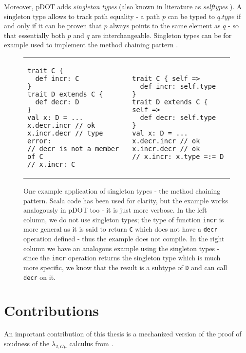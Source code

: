 Moreover, pDOT adds \textit{singleton types} (also known in literature as \textit{selftypes} \cite{zenger}). A singleton type allows to track path equality - a path $p$ can be typed to $q.type$ if and only if it can be proven that $p$ always points to the same element as $q$ - so that essentially both $p$ and $q$ are interchangeable. Singleton types can be for example used to implement the method chaining pattern \cite{pDOT}.

\begin{figure}[h]
\caption{One example application of singleton types - the method chaining pattern. Scala code has been used for clarity, but the example works analogously in pDOT too - it is just more verbose. In the left column, we do not use singleton types; the type of function \texttt{incr} is more general as it is said to return \texttt{C} which does not have a \texttt{decr} operation defined - thus the example does not compile. In the right column we have an analogous example using the singleton types - since the \texttt{incr} operation returns the singleton type which is much more specific, we know that the result is a subtype of \texttt{D} and can call \texttt{decr} on it.}
\begin{tabular}{p{} p{}}
\begin{verbatim}
trait C {
  def incr: C
}
trait D extends C {
  def decr: D
}
val x: D = ...
x.decr.incr // ok
x.incr.decr // type error:
// decr is not a member of C
// x.incr: C
\end{verbatim}
    &
\begin{verbatim}
trait C { self =>
  def incr: self.type
}
trait D extends C { self =>
  def decr: self.type
}
val x: D = ...
x.decr.incr // ok
x.incr.decr // ok
// x.incr: x.type =:= D
\end{verbatim}
\end{tabular}  
\end{figure}


\section{Contributions}


An important contribution of this thesis is a mechanized version of the proof of soudness of the $\lambda_{2,G\mu}$ calculus from \cite{XiGRDT}.
